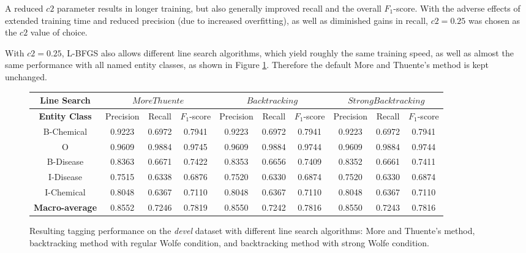 \documentclass[10pt, oneside]{article}
\begin{document}
A reduced $c2$ parameter results in longer training, but also generally improved recall and the overall $F_1$-score. With the adverse effects of extended training time and reduced precision (due to increased overfitting), as well as diminished gains in recall, $c2=0.25$ was chosen as the $c2$ value of choice.

With $c2=0.25$, L-BFGS also allows different line search algorithms, which yield roughly the same training speed, as well as almost the same performance with all named entity classes, as shown in Figure \ref{fig:linesearch}. Therefore the default More and Thuente's method is kept unchanged.

\begin{figure}[h]
\begin{center}
\fontsize{9}{11}\selectfont
\begin{tabular}{|*{10}{c|}}\hline
\textbf{Line Search}  & \multicolumn{3}{c|}{$MoreThuente$} & \multicolumn{3}{c|}{$Backtracking$} & \multicolumn{3}{c|}{$StrongBacktracking$}  \\ \hline 
\textbf{Entity Class} & Precision & Recall & $F_1$-score & Precision & Recall & $F_1$-score & Precision & Recall & $F_1$-score \\ \hline
B-Chemical & 0.9223 & 0.6972 & 0.7941 & 0.9223 & 0.6972 & 0.7941 & 0.9223 & 0.6972 & 0.7941 \\ \hline
O                 & 0.9609 & 0.9884 & 0.9745 & 0.9609 & 0.9884 & 0.9744 & 0.9609 & 0.9884 & 0.9744 \\ \hline
B-Disease   & 0.8363 & 0.6671 & 0.7422 & 0.8353 & 0.6656 & 0.7409 & 0.8352 & 0.6661 & 0.7411 \\ \hline
I-Disease    & 0.7515 & 0.6338 & 0.6876 & 0.7520 & 0.6330 & 0.6874 & 0.7520 & 0.6330 & 0.6874 \\ \hline
I-Chemical  & 0.8048 & 0.6367 & 0.7110 & 0.8048 & 0.6367 & 0.7110 & 0.8048 & 0.6367 & 0.7110 \\ \hline
\textbf{Macro-average} & 0.8552 & 0.7246 & 0.7819 & 0.8550 & 0.7242 & 0.7816 & 0.8550 & 0.7243 & 0.7816 \\ \hline
\end{tabular}
\caption{\label{fig:linesearch} Resulting tagging performance on the \emph{devel} dataset with different line search algorithms: More and Thuente's method, backtracking method with regular Wolfe condition, and backtracking method with strong Wolfe condition.}
\end{center}
\end{figure}
\end{document}
